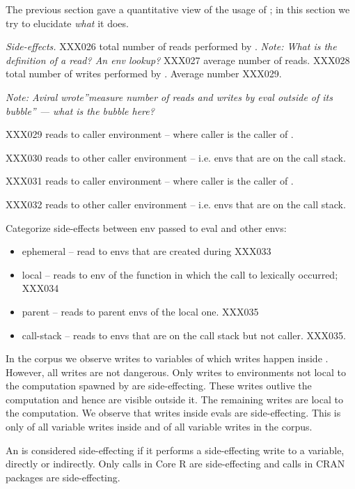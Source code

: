 \documentclass[USenglish,cleveref, autoref, thm-restate]{lipics-v2019}
\newcommand{\mypara}[1]{\medskip\noindent\emph{#1}\xspace}
\newcommand{\NOTE}[1]{{\it Note: #1}\xspace}
\begin{document}
The previous section gave a quantitative view of the usage of \eval;
in this section we try to elucidate \emph{what} it does.

\mypara{Side-effects.} XXX026 total number of reads performed by
\eval. \NOTE{What is the definition of a read? An env lookup?} XXX027
average number of reads. XXX028 total number of writes performed by
\eval. Average number XXX029.

\NOTE{Aviral wrote''measure number of reads and writes by eval outside
  of its bubble'' --- what is the bubble here?}

XXX029 reads to caller environment -- where caller is the caller of
\eval.

XXX030 reads to other caller environment -- i.e. envs that are on the
call stack.

XXX031 reads to caller environment -- where caller is the caller of
\eval.

XXX032 reads to other caller environment -- i.e. envs that are on the
call stack.

Categorize side-effects between env passed to eval and other envs:
\begin{itemize}
\item ephemeral -- read to envs that are created during \eval  XXX033
\item local -- reads to env of the function in which the call to \eval
  lexically occurred; XXX034
\item parent -- reads to parent envs of the local one. XXX035
\item call-stack -- reads to envs that are on the call stack but not
  caller. XXX035.
\end{itemize}

In the corpus we observe \AllWritesRnd writes to variables of which
\EvalWritesRnd writes happen inside \eval. However, all writes are not
dangerous. Only writes to environments not local to the computation
spawned by \eval are side-effecting. These writes outlive the
computation and hence are visible outside it. The remaining writes are
local to the computation. We observe that \EvalSideEffectingWritesRnd
writes inside evals are side-effecting. This is only
\EvalSideEffectingWritesEvalPerc of all variable writes inside \eval
and \EvalSideEffectingWritesAllPerc of all variable writes in the
corpus.

An \eval is considered side-effecting if it performs a side-effecting
write to a variable, directly or indirectly. Only
\SideEffectingCoreCallPerc \eval calls in Core R are side-effecting
and \SideEffectingPackageCallPerc \eval calls in CRAN packages are
side-effecting.
\end{document}
